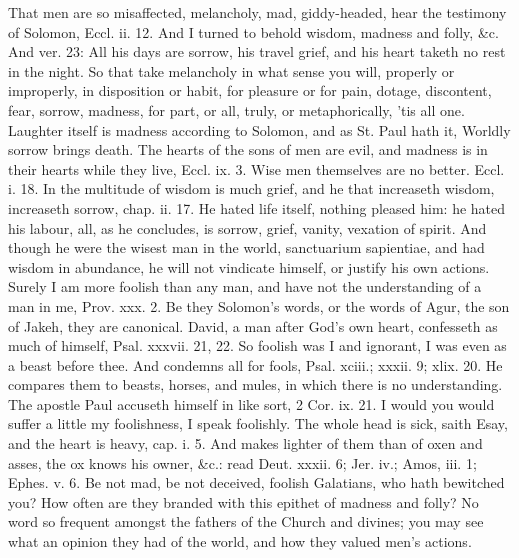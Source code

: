 {That men are so misaffected, melancholy, mad, giddy-headed, hear the
testimony of Solomon, Eccl. ii. 12. And I turned to behold wisdom,
madness and folly, \&c. And ver. 23: All his days are sorrow, his travel
grief, and his heart taketh no rest in the night. So that take
melancholy in what sense you will, properly or improperly, in
disposition or habit, for pleasure or for pain, dotage, discontent,
fear, sorrow, madness, for part, or all, truly, or metaphorically, 'tis
all one. Laughter itself is madness according to Solomon, and as St.
Paul hath it, Worldly sorrow brings death. The hearts of the sons of
men are evil, and madness is in their hearts while they live, Eccl. ix.
3. Wise men themselves are no better. Eccl. i. 18. In the multitude of
wisdom is much grief, and he that increaseth wisdom, increaseth sorrow,
chap. ii. 17. He hated life itself, nothing pleased him: he hated his
labour, all, as he concludes, is sorrow, grief, vanity, vexation
of spirit. And though he were the wisest man in the world, sanctuarium
sapientiae, and had wisdom in abundance, he will not vindicate himself,
or justify his own actions. Surely I am more foolish than any man, and
have not the understanding of a man in me, Prov. xxx. 2. Be they
Solomon's words, or the words of Agur, the son of Jakeh, they are
canonical. David, a man after God's own heart, confesseth as much of
himself, Psal. xxxvii. 21, 22. So foolish was I and ignorant, I was
even as a beast before thee. And condemns all for fools, Psal. xciii.;
xxxii. 9; xlix. 20. He compares them to beasts, horses, and mules, in
which there is no understanding. The apostle Paul accuseth himself in
like sort, 2 Cor. ix. 21. I would you would suffer a little my
foolishness, I speak foolishly. The whole head is sick, saith Esay, and
the heart is heavy, cap. i. 5. And makes lighter of them than of oxen
and asses, the ox knows his owner, \&c.: read Deut. xxxii. 6; Jer. iv.;
Amos, iii. 1; Ephes. v. 6. Be not mad, be not deceived, foolish
Galatians, who hath bewitched you? How often are they branded with this
epithet of madness and folly? No word so frequent amongst the fathers
of the Church and divines; you may see what an opinion they had of the
world, and how they valued men's actions.

}
